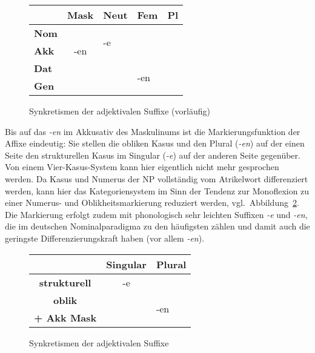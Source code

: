 \begin{figure}[!htbp]
  \centering
  \begin{tabular}{|l|llll|}
    \cline{2-5}
    \multicolumn{1}{c|}{}& \textbf{Mask} & \textbf{Neut} & \textbf{Fem} & \textbf{Pl} \\
    \hline
    \textbf{Nom} && \multirow{2}{*}{-e} & \multicolumn{1}{c|}{} & \\ \cline{2-2}
    \textbf{Akk} & \multicolumn{1}{c|}{-en} && \multicolumn{1}{c|}{} & \\ \cline{2-4}
    \textbf{Dat} &&& \multirow{2}{*}{-en} & \\
    \textbf{Gen} &&&& \\
    \hline
  \end{tabular}
  \caption{Synkretismen der adjektivalen Suffixe (vorläufig)}
  \label{fig:schwacheadj}
\end{figure}

Bis auf das \textit{-en} im Akkusativ des Maskulinums ist die Markierungsfunktion der Affixe eindeutig:
Sie stellen die obliken Kasus und den Plural (\textit{-en}) auf der einen Seite den strukturellen Kasus im Singular (\textit{-e}) auf der anderen Seite gegenüber.
Von einem Vier-Kasus-System kann hier eigentlich nicht mehr gesprochen werden.
Da Kasus und Numerus der NP vollständig vom Atrikelwort differenziert werden, kann hier das Kategoriensystem im Sinn der Tendenz zur Monoflexion zu einer Numerus- und Oblikheitsmarkierung reduziert werden, vgl.\ Abbildung~\ref{fig:schwacheadj-r}.
Die Markierung erfolgt zudem mit phonologisch sehr leichten Suffixen \textit{-e} und \textit{-en}, die im deutschen Nominalparadigma zu den häufigsten zählen und damit auch die geringste Differenzierungskraft haben (vor allem \textit{-en}).


\begin{figure}[!htbp]
  \centering
  \begin{tabular}{|l|ll|}
	\cline{2-3}
	\multicolumn{1}{c|}{} & \multicolumn{1}{c|}{\textbf{Singular}} & \multicolumn{1}{c|}{\textbf{Plural}} \\
	\hline
	\multicolumn{1}{|c|}{\textbf{strukturell}} & \multicolumn{1}{c|}{-e} &  \\	
	\cline{1-2}
	\multicolumn{1}{|c|}{\textbf{oblik}} & & \multirow{2}{*}{-en} \\	
	\multicolumn{1}{|c|}{\textbf{+ Akk Mask}} & & \\	
	\hline
  \end{tabular}
  \caption{Synkretismen der adjektivalen Suffixe}
  \label{fig:schwacheadj-r}
\end{figure}

